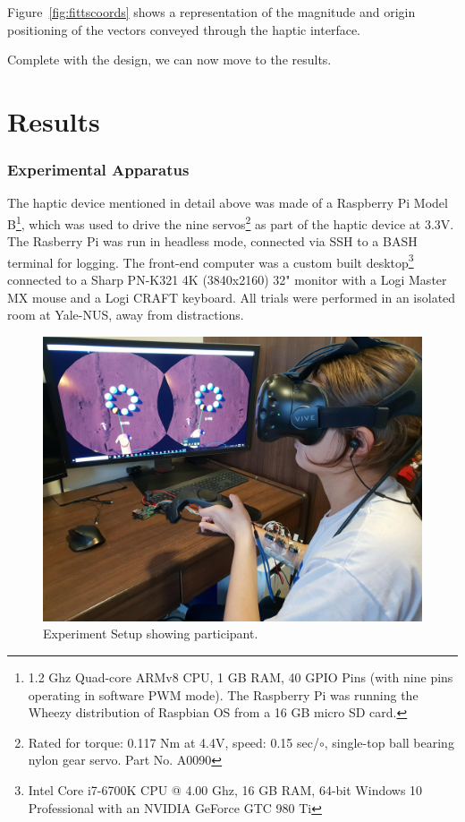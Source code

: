 \documentclass[
12pt, %
oneside, %
english, %
doublespacing, %
headsepline, %
]{MastersDoctoralThesis} %
\begin{document}
\begin{enumerate}
	Figure~\ref{fig:fittscoords} shows a representation of the magnitude and origin positioning of the vectors conveyed through the haptic interface.
\end{enumerate}

Complete with the design, we can now move to the results.

\chapter{Results}
\label{Results}

\subsection{Experimental Apparatus}

The haptic device mentioned in detail above was made of a Raspberry Pi Model B\footnote{1.2 Ghz Quad-core ARMv8 CPU, 1 GB RAM, 40 GPIO Pins (with nine pins operating in software PWM mode). The Raspberry Pi was running the Wheezy distribution of Raspbian OS from a 16 GB micro SD card.}, which was used to drive the nine servos\footnote{Rated for torque: 0.117 Nm at 4.4V, speed: 0.15 sec/$\circ$, single-top ball bearing nylon gear servo. Part No. A0090} as part of the haptic device at 3.3V. The Rasberry Pi was run in headless mode, connected via SSH to a BASH terminal for logging. The front-end computer was a custom built desktop\footnote{Intel Core i7-6700K CPU @ 4.00 Ghz, 16 GB RAM, 64-bit Windows 10 Professional with an NVIDIA GeForce GTC 980 Ti} connected to a Sharp PN-K321 4K (3840x2160) 32" monitor with a Logi Master MX mouse and a Logi CRAFT keyboard. All trials were performed in an isolated room at Yale-NUS, away from distractions.

\begin{figure}[h]
	\centering\includegraphics[width=1\linewidth]{images/experimentsetup.jpg}
	\decoRule
	\caption[Experiment Setup]{Experiment Setup showing participant.}
	\label{fig:experimentsetup}
\end{figure}
\end{document}
